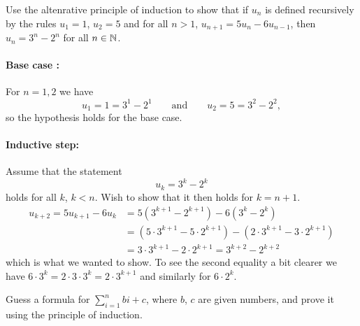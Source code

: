 \documentclass[a4paper, english, 12pt]{article} %
\begin{document}
\titlebox

\begin{problem}[5]
  Use the altenrative principle of induction to show that if $u_n$ is defined
  recursively by the rules $u_1=1$, $u_2=5$ and for all $n > 1$, $u_{n+1} = 5 u_n -
  6 u_{n-1}$, then $u_n = 3^n - 2^n$ for all $n \in \mathbb{N}$.
\end{problem}

\begin{answer}
  \paragraph{Base case :} For $n=1,2$ we have
  \begin{equation*}
    u_1 = 1 = 3^1 - 2^1 \qquad \text{and} \qquad u_2 = 5 = 3^2 - 2^2 ,
  \end{equation*}
  so the hypothesis holds for the base case.
  \paragraph{Inductive step:} Assume that the statement
  \begin{equation*}
    u_{k} = 3^k - 2^k
  \end{equation*}
  holds for all $k$, $k < n$. Wish to show that it then holds for $k = n +1$.
  \begin{align*}
    u_{k+2} = 5 u_{k+1} - 6 u_{k}
    & = 5 (3^{k+1} - 2^{k+1}) - 6(3^{k} - 2^k) \\
    & = (5 \cdot 3^{k+1} - 5 \cdot 2^{k+1}) - (2 \cdot 3^{k+1} - 3 \cdot 2^{k+1}) \\
    & = 3 \cdot 3^{k+1} - 2 \cdot 2^{k+1}
    = 3^{k+2} - 2^{k+2}
  \end{align*}
  which is what we wanted to show. To see the second equality a bit clearer we
  have $6 \cdot 3^k = 2 \cdot 3 \cdot 3^k = 2 \cdot 3^{k+1}$ and similarly for
  $6 \cdot 2^k$. 
\end{answer}

\newpageanswer

\begin{problem}
  \begin{subproblem}
    \label{subproblem:6a}
    Guess a formula for $\sum_{i=1}^n bi + c$, where $b$, $c$ are given numbers,
    and prove it using the principle of induction. 
  \end{subproblem}
\end{problem}
\end{document}
